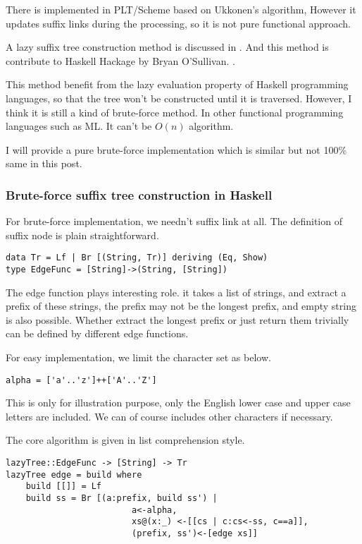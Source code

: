 \documentclass{article}
\begin{document}
There is implemented in PLT/Scheme\cite{plt-stree} based on
Ukkonen's algorithm, However it updates suffix links during the 
processing, so it is not pure functional approach.

A lazy suffix tree construction method is discussed in \cite{GieKur95}.
And this method is contribute to Haskell Hackage by Bryan O'Sullivan.
\cite{Hackage-STree}.

This method benefit from the lazy evaluation property of 
Haskell programming languages, so that the tree won't be constructed
until it is traversed. However, I think it is still a kind of brute-force
method. In other functional programming languages such as ML.
It can't be $O(n)$ algorithm.

I will provide a pure brute-force implementation which is similar
but not 100\% same in this post.

\subsubsection*{Brute-force suffix tree construction in Haskell}

For brute-force implementation, we needn't suffix link at all. The definition
of suffix node is plain straightforward.

\lstset{language=Haskell}
\begin{lstlisting}
data Tr = Lf | Br [(String, Tr)] deriving (Eq, Show)
type EdgeFunc = [String]->(String, [String])
\end{lstlisting}

The edge function plays interesting role. it takes a list of strings,
and extract a prefix of these strings, the prefix may not be the
longest prefix, and empty string is also possible. Whether extract
the longest prefix or just return them trivially can be defined by different
edge functions.

For easy implementation, we limit the character set as below.

\begin{lstlisting}
alpha = ['a'..'z']++['A'..'Z']
\end{lstlisting}

This is only for illustration purpose, only the English lower case and upper
case letters are included. We can of course includes other characters if necessary.

The core algorithm is given in list comprehension style.

\begin{lstlisting}
lazyTree::EdgeFunc -> [String] -> Tr
lazyTree edge = build where
    build [[]] = Lf
    build ss = Br [(a:prefix, build ss') | 
                         a<-alpha, 
                         xs@(x:_) <-[[cs | c:cs<-ss, c==a]],
                         (prefix, ss')<-[edge xs]]
\end{lstlisting}
\end{document}
